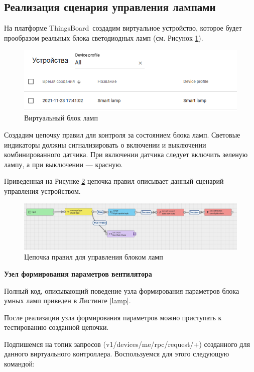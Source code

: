 \documentclass[a4paper,14pt]{extarticle}
\newcommand{\tb}{ThingsBoard~}
\begin{document}
\subsection{Реализация сценария управления лампами}


На платформе \tb создадим виртуальное устройство, которое будет прообразом реальных блока светодиодных ламп (см. Рисунок \ref{fig:dev-2}).


\begin{figure}[h!]
	\centering
	\includegraphics[width=0.5\linewidth]{images/dev-2}
	\caption{Виртуальный блок ламп}
	\label{fig:dev-2}
\end{figure}


Создадим цепочку правил для контроля за состоянием блока ламп. Световые индикаторы должны сигнализировать о включении и выключении комбинированного датчика. При включении датчика следует включить зеленую лампу, а при выключении --- красную. 

Приведенная на Рисунке \ref{fig:chains-2} цепочка правил описывает данный сценарий управления устройством.
\begin{figure}[h!]
	\centering
	\includegraphics[width=0.6\linewidth]{images/chains-2}
	\caption{Цепочка правил для управления блоком ламп}
	\label{fig:chains-2}
\end{figure}


\textbf{Узел формирования параметров вентилятора}

Полный код, описывающий поведение узла формирования параметров блока умных ламп приведен в Листинге \ref{lamp}.




После реализации узла формирования параметров можно приступать к тестированию созданной цепочки. 

Подпишемся на топик запросов (v1/devices/me/rpc/request/+) созданного для данного
виртуального контроллера. Воспользуемся для этого следующую командой:
\end{document}

